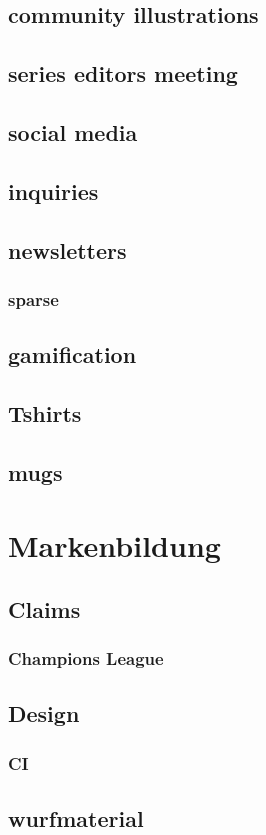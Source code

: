 \documentclass[output=guidelines,guidelines] {langscibook}
\begin{document}
\subsection{community illustrations}
\subsection{series editors meeting}
\subsection{social media}
\subsection{inquiries}
\subsection{newsletters}
\subsubsection{sparse}
\subsection{gamification}
\subsection{Tshirts}
\subsection{mugs}
\section{Markenbildung}
\subsection{Claims}
\subsubsection{Champions League}
\subsection{Design}
\subsubsection{CI}
\subsection{wurfmaterial}
\end{document}
